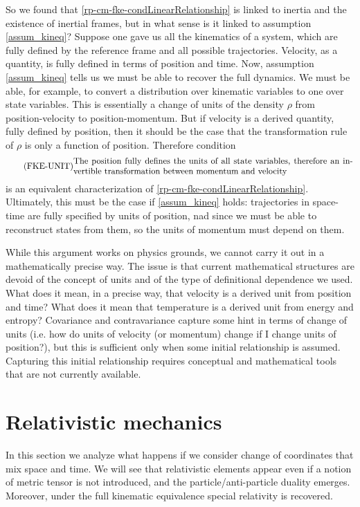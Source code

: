 So we found that \ref{rp-cm-fke-condLinearRelationship} is linked to inertia and the existence of inertial frames, but in what sense is it linked to assumption \ref{assum_kineq}? Suppose one gave us all the kinematics of a system, which are fully defined by the reference frame and all possible trajectories. Velocity, as a quantity, is fully defined in terms of position and time. Now, assumption \ref{assum_kineq} tells us we must be able to recover the full dynamics. We must be able, for example, to convert a distribution over kinematic variables to one over state variables. This is essentially a change of units of the density $\rho$ from position-velocity to position-momentum. But if velocity is a derived quantity, fully defined by position, then it should be the case that the transformation rule of $\rho$ is only a function of position. Therefore condition
\begin{equation}\label{rp-cm-fke-condUnits}
	\tag{FKE-UNIT}
	\eqtext{The position fully defines the units of all state variables, therefore an invertible transformation between momentum and velocity}
\end{equation}
is an equivalent characterization of \ref{rp-cm-fke-condLinearRelationship}. Ultimately, this must be the case if \ref{assum_kineq} holds: trajectories in space-time are fully specified by units of position, nad since we must be able to reconstruct states from them, so the units of momentum must depend on them.

While this argument works on physics grounds, we cannot carry it out in a mathematically precise way. The issue is that current mathematical structures are devoid of the concept of units and of the type of definitional dependence we used. What does it mean, in a precise way, that velocity is a derived unit from position and time? What does it mean that temperature is a derived unit from energy and entropy? Covariance and contravariance capture some hint in terms of change of units (i.e. how do units of velocity (or momentum) change if I change units of position?), but this is sufficient only when some initial relationship is assumed. Capturing this initial relationship requires conceptual and mathematical tools that are not currently available.

\section{Relativistic mechanics}

In this section we analyze what happens if we consider change of coordinates that mix space and time. We will see that relativistic elements appear even if a notion of metric tensor is not introduced, and the particle/anti-particle duality emerges. Moreover, under the full kinematic equivalence special relativity is recovered.


